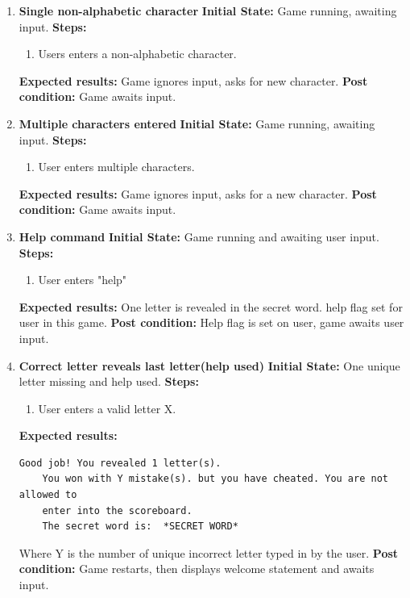 \documentclass{article}
\begin{document}
{\begin{enumerate}
	\item \textbf{Single non-alphabetic character}\newline
	\textbf{Initial State:} Game running, awaiting input.\newline
	\textbf{Steps:}
	\begin{enumerate}
	\item Users enters a non-alphabetic character.
	\end{enumerate}
	\textbf{Expected results:} Game ignores input, asks for new character.\newline
	\textbf{Post condition:} Game awaits input.

	\item \textbf{Multiple characters entered}\newline
	\textbf{Initial State:} Game running, awaiting input.\newline
	\textbf{Steps:}
	\begin{enumerate}
	\item User enters multiple characters.
	\end{enumerate}
	\textbf{Expected results:} Game ignores input, asks for a new character.\newline
	\textbf{Post condition:} Game awaits input.

	\item \textbf{Help command}\newline
	\textbf{Initial State:} Game running and awaiting user input.\newline
	\textbf{Steps:}
	\begin{enumerate}
	\item User enters "help"
	\end{enumerate}
	\textbf{Expected results:} One letter is revealed in the secret word. help flag set for user in this game.\newline
	\textbf{Post condition:} Help flag is set on user, game awaits user input.\newline

	\item \textbf{Correct letter reveals last letter(help used)}\newline
	\textbf{Initial State:} One unique letter missing and help used.\newline
	\textbf{Steps:}
	\begin{enumerate}
	\item User enters a valid letter X.
	\end{enumerate}
	\textbf{Expected results:}
	\begin{lstlisting}[breaklines, gobble=8]
	Good job! You revealed 1 letter(s).
	You won with Y mistake(s). but you have cheated. You are not allowed to 
	enter into the scoreboard.
	The secret word is:  *SECRET WORD*
	\end{lstlisting}
	Where Y is the number of unique incorrect letter typed in by the user.\newline
	\textbf{Post condition:} Game restarts, then displays welcome statement and awaits input.\newline


\end{enumerate}}
\end{document}
